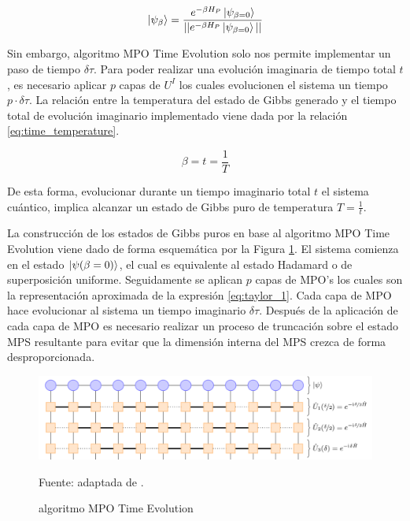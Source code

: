 \begin{equation}
\ket{\psi_\beta}= \frac{e^{-\beta H_P}\ket{\psi_{\beta=0}}}{|| e^{-\beta H_P}\ket{\psi_{\beta=0}}||}   
\label{eq:gibbs_states_tevo}
\end{equation}

Sin embargo, algoritmo MPO Time Evolution solo nos permite implementar un paso de tiempo $\delta \tau$. Para poder realizar una evolución imaginaria de tiempo total $t$, es necesario aplicar $p$ capas de $U^{I}$ los cuales evolucionen el sistema un tiempo $p \cdot \delta \tau$. La relación entre la temperatura del estado de Gibbs generado y el tiempo total de evolución imaginario implementado viene dada por la relación \ref{eq:time_temperature}.

\begin{equation}
\beta = t = \frac{1}{T} 
\label{eq:time_temperature}
\end{equation}

De esta forma, evolucionar durante un tiempo imaginario total $t$ el sistema cuántico, implica alcanzar un estado de Gibbs puro de temperatura $T=\frac{1}{t}$.

\newpage

La construcción de los estados de Gibbs puros en base al algoritmo MPO Time Evolution viene dado de forma esquemática por la Figura \ref{fig:mpo_time_evolution}. El sistema comienza en el estado $\ket{\psi(\beta = 0)}$, el cual es equivalente al estado Hadamard o de superposición uniforme. Seguidamente se aplican $p$ capas de MPO's los cuales son la representación aproximada de la expresión \ref{eq:taylor_1}. Cada capa de MPO hace evolucionar al sistema un tiempo imaginario $\delta \tau$. Después de la aplicación de cada capa de MPO es necesario realizar un proceso de truncación sobre el estado MPS resultante para evitar que la dimensión interna del MPS crezca de forma desproporcionada. 

\begin{figure}[!h]
    \centering
    \includegraphics[scale = 0.7]{img/05-tevo_mps_mpo.png}
    \begin{center}
    \caption{algoritmo MPO Time Evolution}
    Fuente: adaptada de \citep{tn}.
    \label{fig:mpo_time_evolution}
    \end{center}
\end{figure}

